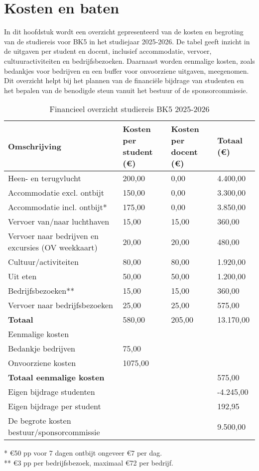 \section{Kosten en baten}

In dit hoofdstuk wordt een overzicht gepresenteerd van de kosten en begroting van de studiereis voor BK5 in het studiejaar 2025-2026. De tabel geeft inzicht in de uitgaven per student en docent, inclusief accommodatie, vervoer, cultuuractiviteiten en bedrijfsbezoeken. Daarnaast worden eenmalige kosten, zoals bedankjes voor bedrijven en een buffer voor onvoorziene uitgaven, meegenomen. Dit overzicht helpt bij het plannen van de financiële bijdrage van studenten en het bepalen van de benodigde steun vanuit het bestuur of de sponsorcommissie.

\begin{table}[h!]
	\centering
	\caption{Financieel overzicht studiereis BK5 2025-2026}
	\label{tab:financien}
	\begin{tabular}{|l|l|l|l|}
		\hline
		\textbf{Omschrijving} & \textbf{Kosten per student (€)} & \textbf{Kosten per docent (€)} & \textbf{Totaal (€)} \\
		\hline
		Heen- en terugvlucht & 200,00 & 0,00 & 4.400,00 \\
		\hline
		Accommodatie excl. ontbijt & 150,00 & 0,00 & 3.300,00 \\
		\hline
		Accommodatie incl. ontbijt* & 175,00 & 0,00 & 3.850,00 \\
		\hline
		Vervoer van/naar luchthaven & 15,00 & 15,00 & 360,00 \\
		\hline
		Vervoer naar bedrijven en excursies (OV weekkaart) & 20,00 & 20,00 & 480,00 \\
		\hline
		Cultuur/activiteiten & 80,00 & 80,00 & 1.920,00 \\
		\hline
		Uit eten & 50,00 & 50,00 & 1.200,00 \\
		\hline
		Bedrijfsbezoeken** & 15,00 & 15,00 & 360,00 \\
		\hline
		Vervoer naar bedrijfsbezoeken & 25,00 & 25,00 & 575,00 \\
		\hline
		\textbf{Totaal} & 580,00 & 205,00 & 13.170,00 \\
		\hline
		Eenmalige kosten & & & \\
		\hline
		Bedankje bedrijven & 75,00 & & \\
		\hline
		Onvoorziene kosten & 1075,00 & & \\
		\hline
		\textbf{Totaal eenmalige kosten} & & & 575,00 \\
		\hline
		Eigen bijdrage studenten & & & -4.245,00 \\
		\hline
		Eigen bijdrage per student & & & 192,95 \\
		\hline
		De begrote kosten bestuur/sponsorcommissie & & & 9.500,00 \\
		\hline
	\end{tabular}
	
	\vspace{0.5em}
	\footnotesize{* €50 pp voor 7 dagen ontbijt ongeveer €7 per dag. \\
		** €3 pp per bedrijfsbezoek, maximaal €72 per bedrijf.}
\end{table}